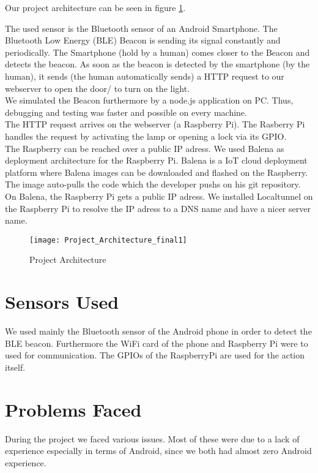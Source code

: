 \documentclass[
10pt, %
a4paper, %
oneside, %
headinclude,footinclude, %
BCOR5mm, %
]{scrartcl}
\begin{document}
Our project architecture can be seen in figure \ref{fig:projectarchitecturefinal}. 

The used sensor is the Bluetooth sensor of an Android Smartphone. The Bluetooth Low Energy (BLE) Beacon is sending its signal constantly and periodically. The Smartphone (hold by a human) comes closer to the Beacon and detects the beacon. As soon as the beacon is detected by the smartphone (by the human), it sends (the human automatically sends) a HTTP request to our webserver to open the door/ to turn on the light.\\

We simulated the Beacon furthermore by a node.js application on PC. Thus, debugging and testing was faster and possible on every machine.\\

The HTTP request arrives on the webserver (a Raspberry Pi). The Rasberry Pi handles the request by activating the lamp or opening a lock via its GPIO.\\

The Raspberry can be reached over a public IP adress. We used Balena as deployment architecture for the Raspberry Pi. Balena \cite{balena} is a IoT cloud deployment platform where Balena images can be downloaded and flashed on the Raspberry. The image auto-pulls the code which the developer pushs on his git repository. On Balena, the Raspberry Pi gets a public IP adress. We installed Localtunnel \cite{localtunnel} on the Raspberry Pi to resolve the IP adress to a DNS name and have a nicer server name.
 
 
\begin{figure}[h]
	\centering
	\texttt{[image: Project\_Architecture\_final1]}
	\caption{Project Architecture}
	\label{fig:projectarchitecturefinal}
\end{figure}

\section{Sensors Used}
We used mainly the Bluetooth sensor of the Android phone in order to detect the BLE beacon. Furthermore the WiFi card of the phone and Raspberry Pi were to used for communication. The GPIOs of the RaspberryPi are used for the action itself.


\section{Problems Faced}
During the project we faced various issues. Most of these were due to a lack of experience especially in terms of Android, since we both had almost zero Android experience.
\end{document}
